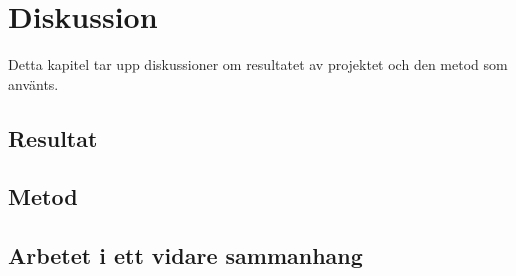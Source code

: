 \chapter{Diskussion}
Detta kapitel tar upp diskussioner om resultatet av projektet och den metod som använts.
\section{Resultat}

\section{Metod}

\section{Arbetet i ett vidare sammanhang}
